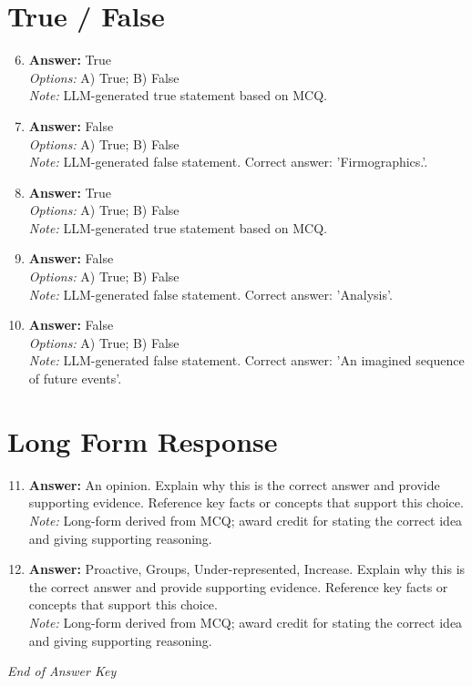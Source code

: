 \documentclass[12pt]{article}
\begin{document}
\section*{True / False}
\begin{enumerate}[label=\arabic*.]
\setcounter{enumi}{5}
\item \textbf{Answer:} True
\\ \textit{Options:} A) True; B) False
\\ \textit{Note:} LLM-generated true statement based on MCQ.
\item \textbf{Answer:} False
\\ \textit{Options:} A) True; B) False
\\ \textit{Note:} LLM-generated false statement. Correct answer: 'Firmographics.'.
\item \textbf{Answer:} True
\\ \textit{Options:} A) True; B) False
\\ \textit{Note:} LLM-generated true statement based on MCQ.
\item \textbf{Answer:} False
\\ \textit{Options:} A) True; B) False
\\ \textit{Note:} LLM-generated false statement. Correct answer: 'Analysis'.
\item \textbf{Answer:} False
\\ \textit{Options:} A) True; B) False
\\ \textit{Note:} LLM-generated false statement. Correct answer: 'An imagined sequence of future events'.
\end{enumerate}

\section*{Long Form Response}
\begin{enumerate}[label=\arabic*.]
\setcounter{enumi}{10}
\item \textbf{Answer:} An opinion. Explain why this is the correct answer and provide supporting evidence. Reference key facts or concepts that support this choice.
\\ \textit{Note:} Long-form derived from MCQ; award credit for stating the correct idea and giving supporting reasoning.
\item \textbf{Answer:} Proactive, Groups, Under-represented, Increase. Explain why this is the correct answer and provide supporting evidence. Reference key facts or concepts that support this choice.
\\ \textit{Note:} Long-form derived from MCQ; award credit for stating the correct idea and giving supporting reasoning.
\end{enumerate}

\vfill
\noindent\textit{End of Answer Key}
\end{document}
